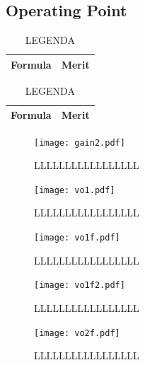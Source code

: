 \subsection{Operating Point}
\begin{table}[H]
  \centering
  \begin{tabular}{|l|r|}
    \hline    
    {\bf Formula} & {\bf Merit} \\ \hline
    
  \end{tabular}
  \caption{LEGENDA}
  \label{tab:op}
\end{table}

\begin{table}[H]
  \centering
  \begin{tabular}{|l|r|}
    \hline    
    {\bf Formula} & {\bf Merit} \\ \hline
    
  \end{tabular}
  \caption{LEGENDA}
  \label{tab: input}
\end{table}








\begin{figure}[H] \centering
\texttt{[image: gain2.pdf]}
\caption{LLLLLLLLLLLLLLLLL}
\label{fig:2}
\end{figure}

\begin{figure}[H] \centering
\texttt{[image: vo1.pdf]}
\caption{LLLLLLLLLLLLLLLLL}
\label{fig:1}
\end{figure}

\begin{figure}[H] \centering
\texttt{[image: vo1f.pdf]}
\caption{LLLLLLLLLLLLLLLLL}
\label{fig:1}
\end{figure}

\begin{figure}[H] \centering
\texttt{[image: vo1f2.pdf]}
\caption{LLLLLLLLLLLLLLLLL}
\label{fig:1}
\end{figure}

\begin{figure}[H] \centering
\texttt{[image: vo2f.pdf]}
\caption{LLLLLLLLLLLLLLLLL}
\label{fig:1}
\end{figure}

